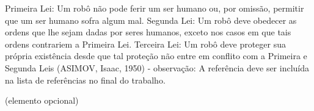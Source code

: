 
\begin{epigrafe}%
Primeira Lei: Um robô não pode ferir um ser humano ou, por omissão, permitir que um ser humano sofra algum mal. Segunda Lei: Um robô deve obedecer as ordens que lhe sejam dadas por seres humanos, exceto nos casos em que tais ordens contrariem a Primeira Lei. Terceira Lei: Um robô deve proteger sua própria existência desde que tal proteção não entre em conflito com a Primeira e Segunda Leis (ASIMOV, Isaac, 1950) - observação: A referência deve ser incluída na lista de referências no final do trabalho.

(elemento opcional)
\end{epigrafe}
